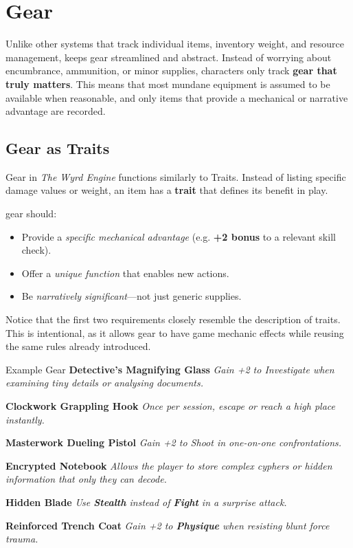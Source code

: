 \section{Gear}

Unlike other systems that track individual items, inventory weight, and resource management, \wyrd keeps gear streamlined and abstract. Instead of worrying about encumbrance, ammunition, or minor supplies, characters only track \textbf{gear that truly matters}. This means that most mundane equipment is assumed to be available when reasonable, and only items that provide a mechanical or narrative advantage are recorded.

\subsection{Gear as Traits}
Gear in \emph{The Wyrd Engine} functions similarly to Traits. Instead of listing specific damage values or weight, an item has a \textbf{trait} that defines its benefit in play. 

\wyrd gear should:
\begin{itemize}
    \item Provide a \emph{specific mechanical advantage} (e.g. \textbf{+2 bonus} to a relevant skill check).
    \item Offer a \emph{unique function} that enables new actions.
    \item Be \emph{narratively significant}—not just generic supplies.
\end{itemize}

Notice that the first two requirements closely resemble the description of traits. This is intentional, as it allows gear to have game mechanic effects while reusing the same rules already introduced.

\begin{WyrdExampleSidebar}[float=!t]{Example Gear}
	\textbf{Detective’s Magnifying Glass}  
	\emph{Gain +2 to Investigate when examining tiny details or analysing documents.}

	\textbf{Clockwork Grappling Hook}  
	\emph{Once per session, escape or reach a high place instantly.}

	\textbf{Masterwork Dueling Pistol}  
	\emph{Gain +2 to Shoot in one-on-one confrontations.}

	\textbf{Encrypted Notebook}  
	\emph{Allows the player to store complex cyphers or hidden information that only they can decode.}

	\textbf{Hidden Blade}  
	\emph{Use \textbf{Stealth} instead of \textbf{Fight} in a surprise attack.}

	\textbf{Reinforced Trench Coat}  
	\emph{Gain +2 to \textbf{Physique} when resisting blunt force trauma.}
\end{WyrdExampleSidebar}


